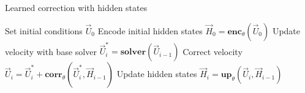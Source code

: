 \begin{algorithm}[t]
  \caption{Learned correction with hidden states}\label{alg:LC_hidden states} 
  \begin{algorithmic}
    \STATE Set initial conditions $\vec{U}_0$
    \STATE Encode initial hidden states $\vec{H}_0 = \textbf{enc}_{\theta}( \vec{U}_0 )$
      \STATE Update velocity with base solver $\vec{U}^*_i =  \textbf{solver} ( \vec{U}_{i-1} )$
      \STATE Correct velocity $\vec{U}_i = \vec{U}^*_i + \textbf{corr}_{\theta}(\vec{U}^*_i, \vec{H}_{i-1} )$
      \STATE Update hidden states $\vec{H}_{i} = \textbf{up}_{\theta} (\vec{U}_i, \vec{H}_{i-1} )$
    \ENDWHILE
  \end{algorithmic}
\end{algorithm} 




